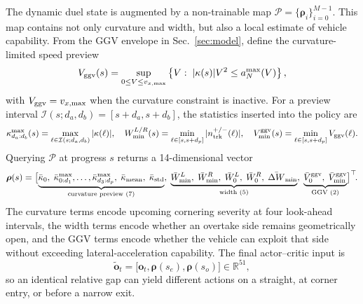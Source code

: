 \documentclass{iopjournal}
\begin{document}
The dynamic duel state is augmented by a non-trainable map
$\mathcal{P}=\{\bm{\rho}_i\}_{i=0}^{M-1}$.  This map contains not only
curvature and width, but also a local estimate of vehicle capability.  From
the GGV envelope in Sec.~\ref{sec:model}, define the curvature-limited speed
preview
\begin{equation}
V_{\rm ggv}(s)=
\sup_{0\le V\le v_{x,\max}}
\left\{
V:\; |\kappa(s)|V^2\le a_N^{\max}(V)
\right\},
\label{eq:ggv_preview}
\end{equation}
with $V_{\rm ggv}=v_{x,\max}$ when the curvature constraint is inactive.
For a preview interval
$\mathcal I(s;d_a,d_b)=[s+d_a,s+d_b]$, the statistics inserted into the
policy are
\begin{equation}
\kappa_{d_a:d_b}^{\max}(s)=
\max_{\ell\in\mathcal I(s;d_a,d_b)}|\kappa(\ell)|,\quad
W_{\min}^{L/R}(s)=
\min_{\ell\in[s,s+d_p]} |n_{\rm trk}^{+/-}(\ell)|,\quad
V_{\min}^{\rm ggv}(s)=
\min_{\ell\in[s,s+d_p]}V_{\rm ggv}(\ell).
\label{eq:prior_statistics}
\end{equation}
Querying $\mathcal{P}$ at progress $s$ returns a 14-dimensional vector
\begin{equation}
\bm{\rho}(s)=
\bigl[
\underbrace{\bar\kappa_0,\;
\bar\kappa_{0:d_1}^{\max},\ldots,
\bar\kappa_{d_3:d_p}^{\max},\;
\bar\kappa_{\rm mean},\;
\bar\kappa_{\rm std}}_{\text{curvature preview (7)}},\;
\underbrace{\bar W_{\min}^{L},\;
\bar W_{\min}^{R},\;
\bar W_0^L,\;
\bar W_0^R,\;
\bar{\Delta W}_{\min}}_{\text{width (5)}},\;
\underbrace{\bar V_0^{\rm ggv},\;
\bar V_{\min}^{\rm ggv}}_{\text{GGV (2)}}
\bigr]^\top\!.
\label{eq:track_prior}
\end{equation}
The curvature terms encode upcoming cornering severity at four look-ahead
intervals, the width terms encode whether an overtake side remains
geometrically open, and the GGV terms encode whether the vehicle can
exploit that side without exceeding lateral-acceleration capability.  The
final actor--critic input is
\begin{equation}
\widetilde{\bm{o}}_t=
\bigl[\bm{o}_t,\bm{\rho}(s_e),\bm{\rho}(s_o)\bigr]\in\mathbb{R}^{51},
\label{eq:track_aug_obs}
\end{equation}
so an identical relative gap can yield different actions on a straight, at
corner entry, or before a narrow exit.
\end{document}

